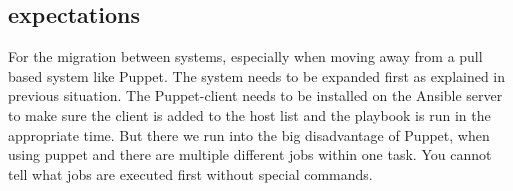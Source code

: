 \subsection{expectations}\label{subsec:expectations}
For the migration between systems, especially when moving away from a pull based system like Puppet. The system needs to be expanded first as explained in previous situation. The Puppet-client needs to be installed on the Ansible server to make sure the client is added to the host list and the playbook is run in the appropriate time. But there we run into the big disadvantage of Puppet, when using puppet and there are multiple different jobs within one task. You cannot tell what jobs are executed first without special commands.  

